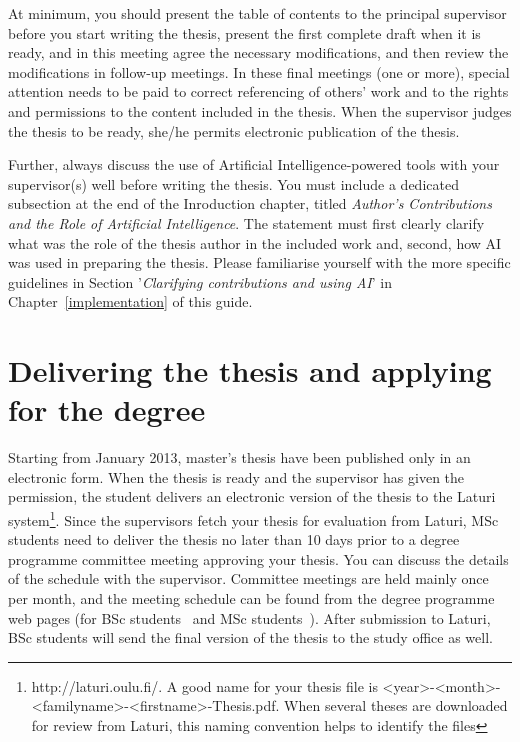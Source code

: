 At minimum, you should present the table of contents to the principal supervisor before you start writing the thesis, present the first complete draft when it is ready, and in this meeting agree the necessary modifications, and then review the modifications in follow-up meetings. In these final meetings (one or more), special attention needs to be paid to correct referencing of others’ work and to the rights and permissions to the content included in the thesis. When the supervisor judges the thesis to be ready, she/he permits electronic publication of the thesis.

Further, always discuss the use of Artificial Intelligence-powered tools with your supervisor(s) well before writing the thesis. You must include a dedicated subsection at the end of the Inroduction chapter, titled \textit{Author's Contributions and the Role of Artificial Intelligence}. The statement must first clearly clarify what was the role of the thesis author in the included work and, second, how AI was used in preparing the thesis. Please familiarise yourself with the more specific guidelines in Section '\textit{Clarifying contributions and using AI}' in Chapter~\ref{implementation} of this guide.

\section{Delivering the thesis and applying for the degree}

Starting from January 2013, master’s thesis have been published only in an electronic form. When the thesis is ready and the supervisor has given the permission, the student delivers an electronic version of the thesis to the Laturi system\footnote{http://laturi.oulu.fi/. A good name for your thesis file is <year>-<month>-<familyname>-<firstname>-Thesis.pdf. When several theses are downloaded for review from Laturi, this naming convention helps to identify the files}. Since the supervisors fetch your thesis for evaluation from Laturi, MSc students need to deliver the thesis no later than 10 days prior to a degree programme committee meeting approving your thesis. You can discuss the details of the schedule with the supervisor. Committee meetings are held mainly once per month, and the meeting schedule can be found from the degree programme web pages (for BSc students~\cite{bscstudies} and MSc students~\cite{mscstudies}). After submission to Laturi, BSc students will send the final version of the thesis to the study office as well.

